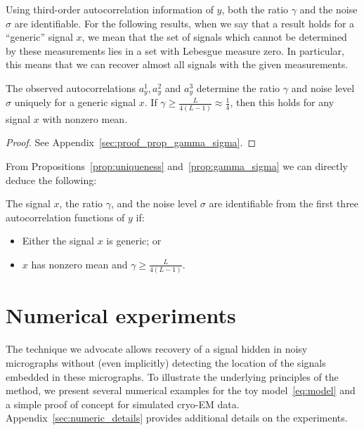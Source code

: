 \documentclass[9pt,twocolumn,twoside,lineno]{pnas-new}
\begin{document}
Using third-order autocorrelation information of $y$, both the ratio $\gamma$ and the noise $\sigma$ are identifiable. For the following results, when we say that a result holds for a ``generic'' signal $x$, we mean that the set of signals which cannot be determined by these measurements
lies in a set with Lebesgue measure zero. 
In particular, this means that we can recover
almost all signals with the given measurements.

\begin{proposition} \label{prop:gamma_sigma}
	The observed autocorrelations $a_y^1,a_y^2$ and  $a_y^3$ determine the ratio $\gamma$ and noise level $\sigma$ uniquely for a generic signal $x$. If $\gamma\geq\frac{L}{4(L-1)}\approx \frac{1}{4}$, then this holds for any signal $x$ with nonzero mean. 
	\begin{proof}
		See Appendix~\ref{sec:proof_prop_gamma_sigma}.
	\end{proof}
\end{proposition}

From Propositions~\ref{prop:uniqueness} and~\ref{prop:gamma_sigma} we can directly deduce the following:
\begin{corollary}
	 The signal $x$, the ratio $\gamma$, and the noise level $\sigma$ are identifiable from the first three autocorrelation functions of $y$ if:
	\begin{itemize}
		\item Either the signal $x$ is generic; or
		\item   $x$ has nonzero mean  and $\gamma\geq\frac{L}{4(L-1)}$.
	\end{itemize}
\end{corollary}


\section{Numerical experiments}

The technique we advocate allows recovery of a signal hidden in noisy micrographs without (even implicitly)  detecting the location  of the signals embedded in these micrographs. To illustrate the underlying principles of the method, we present several numerical examples for the toy model~\eqref{eq:model} and a simple proof of concept for simulated cryo-EM data.  Appendix~\ref{sec:numeric_details} provides additional details on the experiments.
\end{document}

